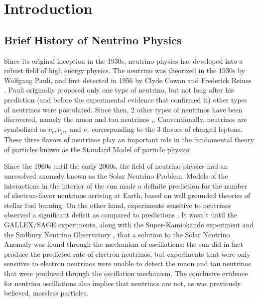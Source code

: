 
\chapter{Introduction}

\section{Brief History of Neutrino Physics}


Since its original inception in the 1930s, neutrino physics has developed into a robust field of high energy physics.  The neutrino was theorized in the 1930s by Wolfgang Pauli, and first detected in 1956 by Clyde Cowan and Frederick Reines \cite{cowanReines}.   Pauli originally proposed only one type of neutrino, but not long after his prediction (and before the experimental evidence that confirmed it) other types of neutrinos were postulated.   Since then, 2 other types of neutrinos have been discovered, namely the muon and tau neutrinos \cite{muon_neutrino},\cite{tau_neutrino}.  Conventionally, neutrinos are symbolized as $\nu_e, \nu_\mu,$ and $\nu_\tau$ corresponding to the 3 flavors of charged leptons.  These three flavors of neutrinos play an important role in the fundamental theory of particles known as the Standard Model of particle physics.



Since the 1960s until the early 2000s, the field of neutrino physics had an unresolved anomaly known as the Solar Neutrino Problem.  Models of the interactions in the interior of the sun made a definite prediction for the number of electron-flavor neutrinos arriving at Earth, based on well grounded theories of stellar fuel burning.  On the other hand, experiments sensitive to neutrinos observed a significant deficit as compared to predictions \cite{davis}.  It wasn't until the GALLEX/SAGE \cite{gallex}\cite{sage} experiments, along with the Super-Kamiokande experiment \cite{superK} and the Sudbury Neutrino Observatory \cite{SNO}, that a solution to the Solar Neutrino Anomaly was found through the mechanism of oscillations: the sun did in fact produce the predicted rate of electron neutrinos, but experiments that were only sensitive to electron neutrinos were unable to detect the muon and tau neutrinos that were produced through the oscillation mechanism.  The conclusive evidence for neutrino oscillations also implies that neutrinos are not, as was previously believed, massless particles.




